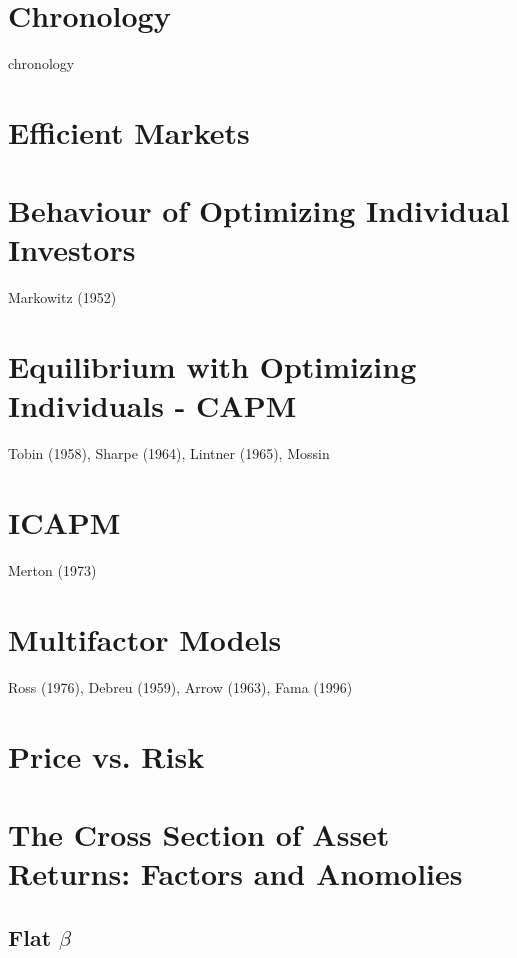 \section{Chronology} \label{sec:Chronology}
{chronology}

\section{Efficient Markets}

\section[Optimizing Individuals]{Behaviour of Optimizing Individual
Investors}\label{sec:OptInd}

Markowitz (1952)\cite{markowitz1952portfolio}

\section[CAPM]{Equilibrium with Optimizing Individuals - CAPM}
\label{sec:OptEq}

Tobin (1958)\cite{tobin1958liquidity},
Sharpe (1964)\cite{sharpe1964capital},
Lintner (1965)\cite{lintner1965valuation},
Mossin

\section{ICAPM}

Merton (1973)\cite{merton1973intertemporal}

\section{Multifactor Models}

Ross (1976)\cite{ross1976arbitrage},
Debreu (1959),
Arrow (1963),
Fama (1996)\cite{fama1996multifactor}

\section{Price vs. Risk}

\section[Factors and Anomolies]{The Cross Section of Asset Returns: Factors and Anomolies}

\subsection{Flat $\beta$}

